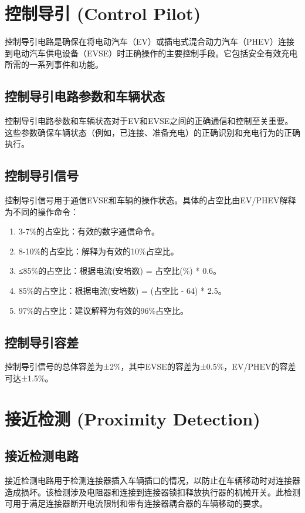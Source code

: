 \section{控制导引 (Control Pilot)}
	控制导引电路是确保在将电动汽车（EV）或插电式混合动力汽车（PHEV）连接到电动汽车供电设备（EVSE）时正确操作的主要控制手段。它包括安全有效充电所需的一系列事件和功能。

\subsection{控制导引电路参数和车辆状态}
	控制导引电路参数和车辆状态对于EV和EVSE之间的正确通信和控制至关重要。这些参数确保车辆状态（例如，已连接、准备充电）的正确识别和充电行为的正确执行。

\subsection{控制导引信号}
	控制导引信号用于通信EVSE和车辆的操作状态。具体的占空比由EV/PHEV解释为不同的操作命令：
	\begin{enumerate}
		\item 3-7\%的占空比：有效的数字通信命令。
		\item 8-10\%的占空比：解释为有效的10\%占空比。
		\item ≤85\%的占空比：根据电流(安培数) = 占空比(\%) * 0.6。
		\item 85\%的占空比：根据电流(安培数) = (占空比 - 64) * 2.5。
		\item 97\%的占空比：建议解释为有效的96\%占空比。
	\end{enumerate}

\subsection{控制导引容差}
控制导引信号的总体容差为±2\%，其中EVSE的容差为±0.5\%，EV/PHEV的容差可达±1.5\%。


\section{接近检测 (Proximity Detection)}

\subsection{接近检测电路} 
接近检测电路用于检测连接器插入车辆插口的情况，以防止在车辆移动时对连接器造成损坏。该检测涉及电阻器和连接到连接器锁扣释放执行器的机械开关。此检测可用于满足连接器断开电流限制和带有连接器耦合器的车辆移动的要求。

